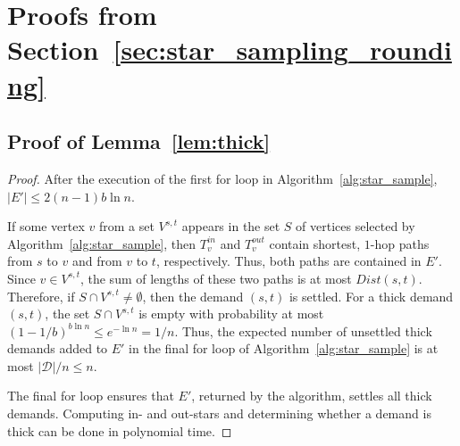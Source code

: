 \section{Proofs from Section~\ref{sec:star_sampling_rounding}}
\subsection{Proof of Lemma~\ref{lem:thick}} \label{app:thick_proof}
\begin{proof}  
    After the execution of the first for loop in Algorithm~\ref{alg:star_sample}, $|E'| \leq 2(n-1)b \ln{n}$.

    If some vertex $v$ from a set $V^{s,t}$ appears in the set $S$ of vertices selected by Algorithm~\ref{alg:star_sample}, then $T^{in}_v$ and $T^{out}_v$ contain shortest, $1$-hop paths from $s$ to $v$ and from $v$ to $t$, respectively. Thus, both paths are contained in $E'$. Since $v \in V^{s,t}$, the sum of lengths of these two paths is at most $Dist(s,t)$. Therefore, if $S \cap V^{s,t} \neq \emptyset$, then the demand $(s,t)$ is settled. For a thick demand $(s,t)$, the set $S \cap V^{s,t}$ is empty with probability at most $(1-1/b)^{b\ln{n}} \leq e^{-\ln{n}} = 1/n$. Thus, the expected number of unsettled thick demands added to $E'$ in the final for loop of Algorithm~\ref{alg:star_sample} is at most $|\mathcal{D}|/n \leq n$.

    The final for loop ensures that $E'$, returned by the algorithm, settles all thick demands. Computing in- and out-stars and determining whether a demand is thick can be done in polynomial time.
\end{proof}


